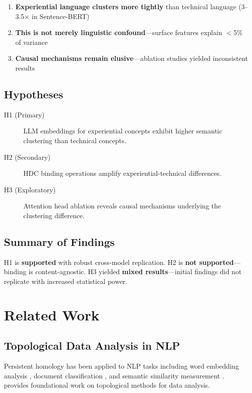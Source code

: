 \documentclass[11pt,a4paper]{article}
\begin{document}
\begin{enumerate}
    \item \textbf{Experiential language clusters more tightly} than technical language (3--3.5$\times$ in Sentence-BERT)
    \item \textbf{This is not merely linguistic confound}---surface features explain $<$5\% of variance
    \item \textbf{Causal mechanisms remain elusive}---ablation studies yielded inconsistent results
\end{enumerate}

\subsection{Hypotheses}

\begin{description}
    \item[H1 (Primary)] LLM embeddings for experiential concepts exhibit higher semantic clustering than technical concepts.
    \item[H2 (Secondary)] HDC binding operations amplify experiential-technical differences.
    \item[H3 (Exploratory)] Attention head ablation reveals causal mechanisms underlying the clustering difference.
\end{description}

\subsection{Summary of Findings}

H1 is \textbf{supported} with robust cross-model replication. H2 is \textbf{not supported}---binding is content-agnostic. H3 yielded \textbf{mixed results}---initial findings did not replicate with increased statistical power.

\section{Related Work}

\subsection{Topological Data Analysis in NLP}

Persistent homology has been applied to NLP tasks including word embedding analysis \citep{savle2019topological}, document classification \citep{zhu2013persistent}, and semantic similarity measurement \citep{michel2017does}. \citet{carlsson2009topology} provides foundational work on topological methods for data analysis.
\end{document}
